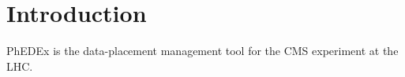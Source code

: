 \section{Introduction}
PhEDEx \cite{PhEDEx} is the data-placement management tool for the CMS \cite{PhEDEx} experiment at the LHC.